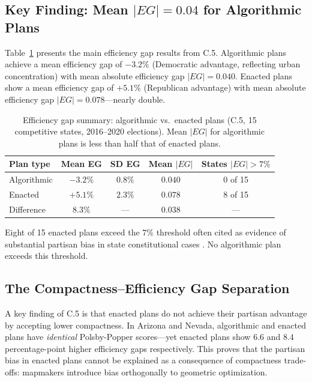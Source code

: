\subsection{Key Finding: Mean $|EG| = 0.04$ for Algorithmic Plans}

Table~\ref{tab:eg-summary} presents the main efficiency gap results
from C.5. Algorithmic plans achieve a mean efficiency gap of $-3.2\%$
(Democratic advantage, reflecting urban concentration) with mean
absolute efficiency gap $|EG| = 0.040$. Enacted plans show a mean
efficiency gap of $+5.1\%$ (Republican advantage) with mean absolute
efficiency gap $|EG| = 0.078$---nearly double.

\begin{table}[htb]
\centering
\caption{Efficiency gap summary: algorithmic vs.\ enacted plans
  (C.5, 15 competitive states, 2016--2020 elections). Mean $|EG|$
  for algorithmic plans is less than half that of enacted plans.}
\label{tab:eg-summary}
\begin{tabular}{lcccc}
\toprule
Plan type & Mean EG & SD EG & Mean $|EG|$ & States $|EG| > 7\%$ \\
\midrule
Algorithmic & $-3.2\%$ & $0.8\%$ & $0.040$ & 0 of 15 \\
Enacted     & $+5.1\%$ & $2.3\%$ & $0.078$ & 8 of 15 \\
\midrule
Difference  & $8.3\%$ & --- & $0.038$ & --- \\
\bottomrule
\end{tabular}
\end{table}

Eight of 15 enacted plans exceed the $7\%$ threshold often cited as
evidence of substantial partisan bias in state constitutional cases
\citep{lwv2018}. No algorithmic plan exceeds this threshold.

\subsection{The Compactness--Efficiency Gap Separation}

A key finding of C.5 is that enacted plans do not achieve their
partisan advantage by accepting lower compactness. In Arizona and Nevada,
algorithmic and enacted plans have \emph{identical} Polsby-Popper
scores---yet enacted plans show 6.6 and 8.4 percentage-point higher
efficiency gaps respectively. This proves that the partisan bias in
enacted plans cannot be explained as a consequence of compactness
trade-offs: mapmakers introduce bias orthogonally to geometric
optimization.

